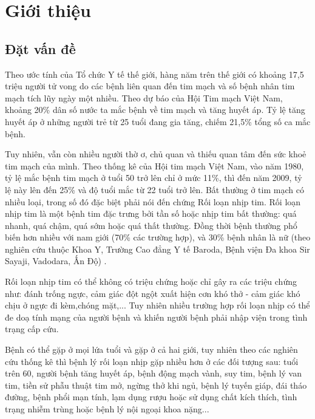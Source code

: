\chapter{Giới thiệu}
\thispagestyle{fancy}
\section{Đặt vấn đề}
Theo ước tính của Tổ chức Y tế thế giới, hàng năm trên thế giới có khoảng 17,5 triệu người tử vong do các bệnh liên quan đến tim mạch và số bệnh nhân tim mạch tích lũy ngày một nhiều. Theo dự báo của Hội Tim mạch Việt Nam, khoảng 20\% dân số nước ta mắc bệnh về tim mạch và tăng huyết áp. Tỷ lệ tăng huyết áp ở những người trẻ từ 25 tuổi đang gia tăng, chiếm 21,5\% tổng số ca mắc bệnh.

Tuy nhiên, vẫn còn nhiều người thờ ơ, chủ quan và thiếu quan tâm đến sức khoẻ tim mạch của mình. Theo thống kê của Hội tim mạch Việt Nam, vào năm 1980, tỷ lệ mắc bệnh tim mạch ở tuổi 50 trở lên chỉ ở mức 11\%, thì đến năm 2009, tỷ lệ này lên đến 25\% và độ tuổi mắc từ 22 tuổi trở lên\cite{baibao}. Bất thường ở tim mạch có nhiều loại, trong số đó đặc biệt phải nói đến chứng Rối loạn nhịp tim. Rối loạn nhịp tim là một bệnh tim đặc trưng bởi tần số hoặc nhịp tim bất thường: quá nhanh, quá chậm, quá sớm hoặc quá thất thường. Đồng thời bệnh thường phổ biến hơn nhiều với nam giới (70\% các trường hợp), và 30\% bệnh nhân là nữ (theo nghiên cứu thuộc Khoa Y, Trường Cao đẳng Y tế Baroda, Bệnh viện Đa khoa Sir Sayaji, Vadodara, Ấn Độ) \cite{rlnt}.

Rối loạn nhịp tim có thể không có triệu chứng hoặc chỉ gây ra các triệu chứng như: đánh trống ngực, cảm giác đột ngột xuất hiện cơn khó thở - cảm giác khó chịu ở ngực đi kèm,chóng mặt,... Tuy nhiên nhiều trường hợp rối loạn nhịp có thể đe doạ tính mạng của người bệnh và khiến người bệnh phải nhập viện trong tình trạng cấp cứu.

Bệnh có thể gặp ở mọi lứa tuổi và gặp ở cả hai giới, tuy nhiên theo các nghiên cứu thống kê thì bệnh lý rối loạn nhịp gặp nhiều hơn ở các đối tượng sau: tuổi trên 60, người bệnh tăng huyết áp, bệnh động mạch vành, suy tim, bệnh lý van tim, tiền sử phẫu thuật tim mở, ngừng thở khi ngủ, bệnh lý tuyến giáp, đái tháo đường, bệnh phổi mạn tính, lạm dụng rượu hoặc sử dụng chất kích thích, tình trạng nhiễm trùng hoặc bệnh lý nội ngoại khoa nặng...

